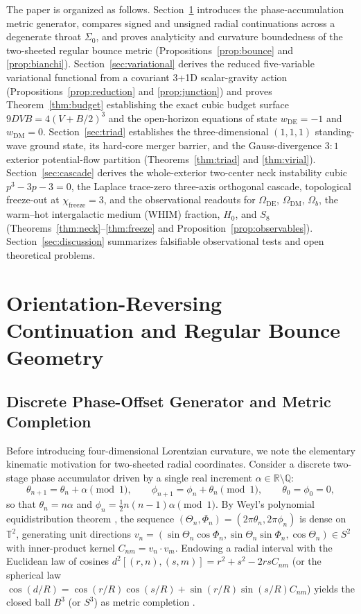 \documentclass[pdflatex,sn-mathphys-num]{sn-jnl}
\theoremstyle{thmstyleone}
\theoremstyle{thmstyletwo}
\theoremstyle{thmstylethree}
\begin{document}
The paper is organized as follows. Section~\ref{sec:bounce} introduces the phase-accumulation metric generator, compares signed and unsigned radial continuations across a degenerate throat $\Sigma_0$, and proves analyticity and curvature boundedness of the two-sheeted regular bounce metric (Propositions~\ref{prop:bounce} and \ref{prop:bianchi}). Section~\ref{sec:variational} derives the reduced five-variable variational functional from a covariant 3+1D scalar-gravity action (Propositions~\ref{prop:reduction} and \ref{prop:junction}) and proves Theorem~\ref{thm:budget} establishing the exact cubic budget surface $9DVB = 4(V + B/2)^3$ and the open-horizon equations of state $w_{\mathrm{DE}} = -1$ and $w_{\mathrm{DM}} = 0$. Section~\ref{sec:triad} establishes the three-dimensional $(1,1,1)$ standing-wave ground state, its hard-core merger barrier, and the Gauss-divergence $3:1$ exterior potential-flow partition (Theorems~\ref{thm:triad} and \ref{thm:virial}). Section~\ref{sec:cascade} derives the whole-exterior two-center neck instability cubic $p^3 - 3p - 3 = 0$, the Laplace trace-zero three-axis orthogonal cascade, topological freeze-out at $\chi_{\mathrm{freeze}} = 3$, and the observational readouts for $\Omega_{\mathrm{DE}}$, $\Omega_{\mathrm{DM}}$, $\Omega_b$, the warm--hot intergalactic medium (WHIM) fraction, $H_0$, and $S_8$ (Theorems~\ref{thm:neck}--\ref{thm:freeze} and Proposition~\ref{prop:observables}). Section~\ref{sec:discussion} summarizes falsifiable observational tests and open theoretical problems.

\section{Orientation-Reversing Continuation and Regular Bounce Geometry}\label{sec:bounce}

\subsection{Discrete Phase-Offset Generator and Metric Completion}\label{subsec:generator}

Before introducing four-dimensional Lorentzian curvature, we note the elementary kinematic motivation for two-sheeted radial coordinates. Consider a discrete two-stage phase accumulator driven by a single real increment $\alpha \in \mathbb{R}\setminus\mathbb{Q}$:
\begin{equation}\label{eq:weyl_map}
\theta_{n+1} = \theta_n + \alpha \pmod{1}, \qquad \phi_{n+1} = \phi_n + \theta_n \pmod{1}, \qquad \theta_0 = \phi_0 = 0,
\end{equation}
so that $\theta_n = n\alpha$ and $\phi_n = \frac{1}{2}n(n-1)\alpha \pmod{1}$. By Weyl's polynomial equidistribution theorem \cite{Weyl1916}, the sequence $(\Theta_n, \Phi_n) = (2\pi\theta_n, 2\pi\phi_n)$ is dense on $\mathbb{T}^2$, generating unit directions $v_n = (\sin\Theta_n\cos\Phi_n, \sin\Theta_n\sin\Phi_n, \cos\Theta_n) \in S^2$ with inner-product kernel $C_{nm} = v_n \cdot v_m$. Endowing a radial interval with the Euclidean law of cosines $d^2[(r,n),(s,m)] = r^2 + s^2 - 2rs C_{nm}$ (or the spherical law $\cos(d/R) = \cos(r/R)\cos(s/R) + \sin(r/R)\sin(s/R)C_{nm}$) yields the closed ball $B^3$ (or $S^3$) as metric completion \cite{Ek2026Zenodo}.
\end{document}
